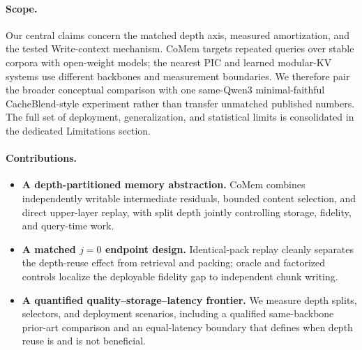 \paragraph{Scope.}
Our central claims concern the matched depth axis, measured amortization, and
the tested Write-context mechanism. CoMem targets repeated queries over stable
corpora with open-weight models; the nearest PIC and learned modular-KV systems
use different backbones and measurement boundaries. We therefore pair the
broader conceptual comparison with one same-Qwen3 minimal-faithful
CacheBlend-style experiment rather than transfer unmatched published numbers.
The full set of deployment, generalization, and statistical limits is
consolidated in the dedicated Limitations section.

\paragraph{Contributions.}
\begin{itemize}[leftmargin=1.2em,itemsep=1pt,topsep=2pt]
\item \textbf{A depth-partitioned memory abstraction.} CoMem combines
independently writable intermediate residuals, bounded content selection, and
direct upper-layer replay, with split depth jointly controlling storage,
fidelity, and query-time work.
\item \textbf{A matched $j{=}0$ endpoint design.} Identical-pack replay cleanly
separates the depth-reuse effect from retrieval and packing; oracle and
factorized controls localize the deployable fidelity gap to independent chunk
writing.
\item \textbf{A quantified quality--storage--latency frontier.} We measure
depth splits, selectors, and deployment scenarios, including a qualified
same-backbone prior-art comparison and an equal-latency boundary that defines
when depth reuse is and is not beneficial.
\end{itemize}
